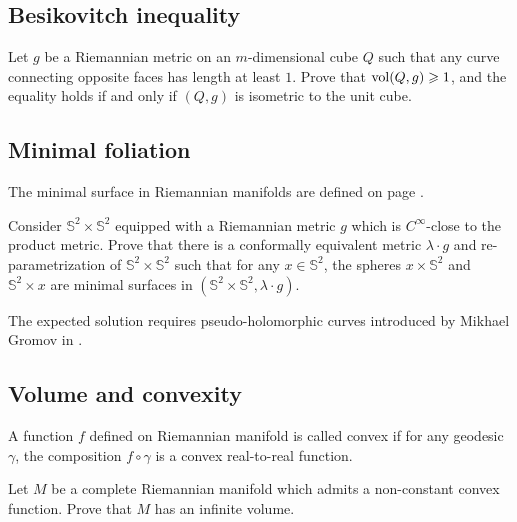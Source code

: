 \subsection*{Besikovitch inequality}
\label{Besikovitch inequality}

\begin{pr}
Let $g$ be a Riemannian metric on an $m$-dimensional cube $Q$ such that any curve connecting opposite faces has length at least $1$. 
Prove that $\operatorname{\rm vol}\nolimits(Q,g)\geqslant 1$, 
and the equality holds if and only if $(Q,g)$ is isometric to the unit cube.
\end{pr}



\subsection*{Minimal foliation\thm}
\label{gromomorphic-curves}

The minimal surface in Riemannian manifolds are defined on page \pageref{minimal surface}.

\begin{pr}
Consider $\mathbb{S}^2\times \mathbb{S}^2$ equipped with a Riemannian metric $g$ 
which is $C^\infty$-close to the product metric. 
Prove that there is a conformally equivalent metric $\lambda\cdot g$ and re-parametrization of $\mathbb{S}^2\times \mathbb{S}^2$
such that for any $x\in \mathbb{S}^2$, the spheres $x\times\mathbb{S}^2$ and $\mathbb{S}^2\times x$ are minimal surfaces 
in $(\mathbb{S}^2\times \mathbb{S}^2,\lambda\cdot g)$.
\end{pr}


The expected solution requires pseudo-holomorphic curves introduced by Mikhael Gromov in \cite{gromov-pseudoholomorphic}.

\subsection*{Volume and convexity\thm}
\label{Volume and convexity} 

A function $f$ defined on Riemannian manifold is called convex if for any geodesic $\gamma$, the composition $f\circ\gamma$ is a convex real-to-real function.

\begin{pr}
Let
$M$ be a complete Riemannian manifold which admits a non-constant
convex function. 
Prove that $M$ has an infinite volume.
\end{pr}

